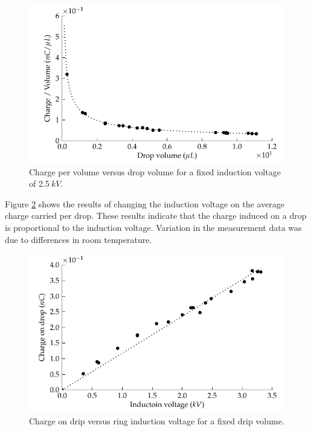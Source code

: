 \begin{figure}[h]
\begin{centering}
\includegraphics{content/appendices/chargedWaterDrops/graphics/dripper_chargePerVolumeVsVolume}
\par\end{centering}

\protect\caption{\label{Figure_Graph_dripper_chargePerVolumeVsVolume}Charge per volume
versus drop volume for a fixed induction voltage of 2.5$\: kV$.}


\end{figure}


Figure \ref{Figure_Graph_dripper_chargeVsVoltage} shows the results
of changing the induction voltage on the average charge carried per
drop. These results indicate that the charge induced on a drop is
proportional to the induction voltage. Variation in the measurement
data was due to differences in room temperature.

\begin{figure}
\begin{centering}
\includegraphics{content/appendices/chargedWaterDrops/graphics/dripper_chargeVsVoltage}
\par\end{centering}

\protect\caption{\label{Figure_Graph_dripper_chargeVsVoltage}Charge on drip versus
ring induction voltage for a fixed drip volume.}
\end{figure}


